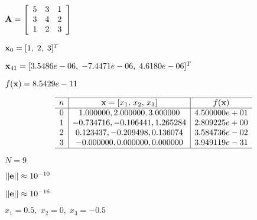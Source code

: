 \documentclass{article}
\def\lthtmlcheckvsize{\ifdim\ht\sizebox<\vsize 
  \ifdim\wd\sizebox<\hsize\expandafter\hfill\fi \expandafter\vfill
  \else\expandafter\vss\fi}%
\begin{document}
{\newpage\clearpage
{}%
$\displaystyle {\bf A}=\left[\begin{array}{ccc}5 & 3 & 1\\3 & 4 & 2\\1 & 2 & 3
\end{array}\right]$%
\lthtmlindisplaymathZ
\lthtmlcheckvsize\clearpage}

{\newpage\clearpage
{}%
$ {\bf x}_0=[1,\;2,\;3]^T$%
\lthtmlindisplaymathZ
\lthtmlcheckvsize\clearpage}

{\newpage\clearpage
{}%
$ {\bf x}_{41}=[3.5486e-06,\;-7.4471e-06,\;4.6180e-06]^T$%
\lthtmlindisplaymathZ
\lthtmlcheckvsize\clearpage}

{\newpage\clearpage
{}%
$ f({\bf x})=8.5429e-11$%
\lthtmlindisplaymathZ
\lthtmlcheckvsize\clearpage}

{\newpage\clearpage
{}%
\begin{displaymath}\begin{array}{c|c|c}\hline
n & {\bf x}=[x_1,\,x_2,\,x_3] & f({\bf x}) \\\hline
0 &  1.000000,  2.000000, 3.000000 & 4.500000e+01 \\
1 & -0.734716, -0.106441, 1.265284 & 2.809225e+00 \\
2 &  0.123437, -0.209498, 0.136074 & 3.584736e-02 \\
3 & -0.000000,  0.000000, 0.000000 & 3.949119e-31 \\\hline
\end{array}\end{displaymath}%
\lthtmldisplayZ
\lthtmlcheckvsize\clearpage}

{\newpage\clearpage
{}%
$ N=9$%
\lthtmlindisplaymathZ
\lthtmlcheckvsize\clearpage}

{\newpage\clearpage
{}%
$ ||{\bf e}||\approx 10^{-10}$%
\lthtmlindisplaymathZ
\lthtmlcheckvsize\clearpage}

{\newpage\clearpage
{}%
$ ||{\bf e}||\approx 10^{-16}$%
\lthtmlindisplaymathZ
\lthtmlcheckvsize\clearpage}

{\newpage\clearpage
{}%
$ x_1=0.5,\;x_2=0,\;x_3=-0.5$%
\lthtmlindisplaymathZ
\lthtmlcheckvsize\clearpage}
\end{document}
